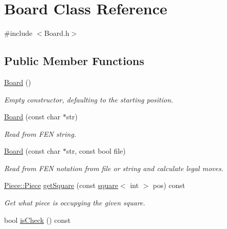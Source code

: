 \hypertarget{classBoard}{}\section{Board Class Reference}
\label{classBoard}


{\ttfamily \#include $<$Board.\+h$>$}

\subsection*{Public Member Functions}
\begin{DoxyCompactItemize}
\item 
\hyperlink{classBoard_a9ee491d4fea680cf69b033374a9fdfcb}{Board} ()\hypertarget{classBoard_a9ee491d4fea680cf69b033374a9fdfcb}{}\label{classBoard_a9ee491d4fea680cf69b033374a9fdfcb}

\begin{DoxyCompactList}\small\item\em Empty constructor, defaulting to the starting position. \end{DoxyCompactList}\item 
\hyperlink{classBoard_a155259ecd3131cbf8c155c1dd19026b0}{Board} (const char $\ast$str)\hypertarget{classBoard_a155259ecd3131cbf8c155c1dd19026b0}{}\label{classBoard_a155259ecd3131cbf8c155c1dd19026b0}

\begin{DoxyCompactList}\small\item\em Read from F\+EN string. \end{DoxyCompactList}\item 
\hyperlink{classBoard_a8dd2a85d6b43bcab4eaf83e1541aeb18}{Board} (const char $\ast$str, const bool file)
\begin{DoxyCompactList}\small\item\em Read from F\+EN notation from file or string and calculate legal moves. \end{DoxyCompactList}\item 
\hyperlink{namespacePiece_a588233307aa6bdb32c1d62c9f20895cc}{Piece\+::\+Piece} \hyperlink{classBoard_af7768fd4eb1c86f89dd50692921228f0}{get\+Square} (const \hyperlink{structsquare}{square}$<$ int $>$ pos) const \hypertarget{classBoard_af7768fd4eb1c86f89dd50692921228f0}{}\label{classBoard_af7768fd4eb1c86f89dd50692921228f0}

\begin{DoxyCompactList}\small\item\em Get what piece is occupying the given square. \end{DoxyCompactList}\item 
bool \hyperlink{classBoard_aab48b0f0af13688b51a05309b2a3da6e}{is\+Check} () const \hypertarget{classBoard_aab48b0f0af13688b51a05309b2a3da6e}{}\label{classBoard_aab48b0f0af13688b51a05309b2a3da6e}


\end{DoxyCompactItemize}
